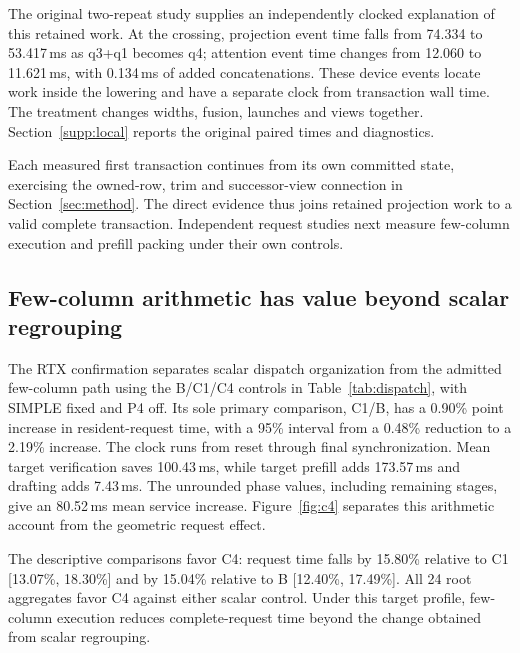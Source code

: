 The original two-repeat study supplies an independently clocked explanation of this retained work. At the crossing, projection event time falls from 74.334 to 53.417\,ms as q3+q1 becomes q4; attention event time changes from 12.060 to 11.621\,ms, with 0.134\,ms of added concatenations. These device events locate work inside the lowering and have a separate clock from transaction wall time. The treatment changes widths, fusion, launches and views together. Section~\ref{supp:local} reports the original paired times and diagnostics.

Each measured first transaction continues from its own committed state, exercising the owned-row, trim and successor-view connection in Section~\ref{sec:method}. The direct evidence thus joins retained projection work to a valid complete transaction. Independent request studies next measure few-column execution and prefill packing under their own controls.

\subsection{Few-column arithmetic has value beyond scalar regrouping}
\label{sec:c4}
The RTX confirmation separates scalar dispatch organization from the admitted few-column path using the B/C1/C4 controls in Table~\ref{tab:dispatch}, with SIMPLE fixed and P4 off. Its sole primary comparison, C1/B, has a 0.90\% point increase in resident-request time, with a 95\% interval from a 0.48\% reduction to a 2.19\% increase. The clock runs from reset through final synchronization. Mean target verification saves 100.43\,ms, while target prefill adds 173.57\,ms and drafting adds 7.43\,ms. The unrounded phase values, including remaining stages, give an 80.52\,ms mean service increase. Figure~\ref{fig:c4} separates this arithmetic account from the geometric request effect.

The descriptive comparisons favor C4: request time falls by 15.80\% relative to C1 [13.07\%, 18.30\%] and by 15.04\% relative to B [12.40\%, 17.49\%]. All 24 root aggregates favor C4 against either scalar control. Under this target profile, few-column execution reduces complete-request time beyond the change obtained from scalar regrouping.


